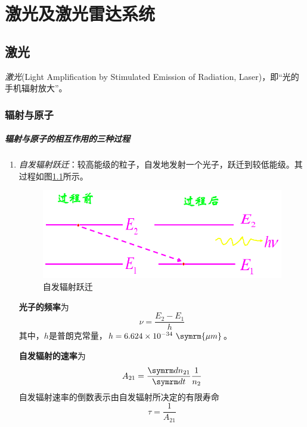 \chapter{激光及激光雷达系统}

\section{激光} %
\textit{激光}(Light Amplification by Stimulated Emission of Radiation, Laser)，即“光的手机辐射放大”。

\subsection{辐射与原子} %
\paragraph{辐射与原子的相互作用的三种过程} \begin{enumerate}
	\item 
		\textit{自发辐射跃迁}：较高能级的粒子，自发地发射一个光子，跃迁到较低能级。其过程如图\ref{fig:自发辐射跃迁}所示。
		\begin{figure}[htbp]
			\centering
			\includegraphics[width=0.7\linewidth]{figure/Chapter2/自发辐射跃迁}
			\caption{自发辐射跃迁}
			\label{fig:自发辐射跃迁}
		\end{figure}
		
		\textbf{光子的频率}为\begin{equation} \nu = \dfrac{E_2-E_1}{h} \end{equation}其中，$ h $是普朗克常量，$ h=6.624 \times 10^{-34} \ \symrm{\mu m} $。
		
		\textbf{自发辐射的速率}为\begin{equation} A_{21} = \dfrac{\diff n_{21}}{\diff t} \dfrac{1}{n_2} \end{equation}
		自发辐射速率的倒数表示由自发辐射所决定的有限寿命\begin{equation} \tau = \dfrac{1}{A_{21}} \end{equation}
		

\end{enumerate}
